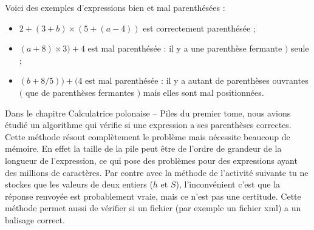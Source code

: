 \documentclass[10pt,class=report,crop=false]{standalone}
\begin{document}

\begin{cours}
Voici des exemples d'expressions bien et mal parenthésées :
\begin{itemize}
	\item $2 + (3 + b) \times (5 + (a - 4))$ est correctement parenthésée ;
	\item $(a+ 8) \times 3 ) + 4$ est mal parenthésée : il y a une parenthèse fermante \og{}$)$\fg{}  seule ;
	\item $(b + 8 / 5)) + (4$ est mal parenthésée : il y a autant de parenthèses ouvrantes 
	\og{}$($\fg{} que de parenthèses fermantes \og{}$)$\fg{} mais elles sont mal positionnées.
\end{itemize}


Dans le chapitre \og{}Calculatrice polonaise – Piles\fg{} du premier tome, nous avions étudié un algorithme qui vérifie si une expression a ses parenthèses correctes. 
Cette méthode résout complètement le problème mais nécessite beaucoup de mémoire. En effet la taille de la pile peut être de l'ordre de grandeur de la longueur de l'expression, ce qui pose des problèmes pour des expressions ayant des millions de caractères. Par contre avec la méthode de l'activité suivante tu ne stockes que les valeurs de deux entiers ($h$ et $S$), l'inconvénient c'est que la réponse renvoyée est probablement vraie,
mais ce n'est pas une certitude. 
Cette méthode permet aussi de vérifier si un fichier (par exemple un fichier \og{}xml\fg{}) a un balisage correct.
\end{cours}



\end{document}
